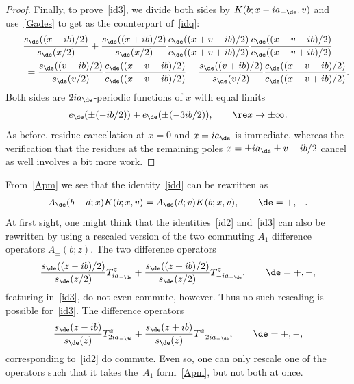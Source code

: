 \begin{proof}
Finally, to prove~\eqref{id3}, we divide both sides by
$K(b;x-ia_{-\de},v)$ and use~\eqref{Gades} to get as the counterpart of~\eqref{idq}:
\begin{gather}
   \frac{s_{\de}((x-ib)/2)}{s_{\de}(x/2)}+\frac{s_{\de}((x+ib)/2)}{s_{\de}(x/2)}\frac{c_{\de}((x+ v-ib)/2)}{c_{\de}((x+ v+ib)/2)}\frac{c_{\de}((x- v-ib)/2)}{c_{\de}((x- v+ib)/2)}  \nonumber \\
\qquad{} = \frac{s_{\de}((v-ib)/2)}{s_{\de}(v/2)} \frac{c_{\de}((x-v-ib)/2)}{c_{\de}((x-v+ib)/2)} +   \frac{s_{\de}((v+ib)/2)}{s_{\de}(v/2)} \frac{c_{\de}((x+v-ib)/2)}{c_{\de}((x+v+ib)/2)}.
\end{gather}
Both sides are $2ia_{\de}$-periodic functions of $x$ with equal limits
\begin{gather}
e_{\de}(\pm (-ib/2))+e_{\de}(\pm (-3ib/2)),\qquad \re x \to\pm\infty.
\end{gather}
As before, residue cancellation at $x=0$ and $x=ia_{\de}$ is immediate, whereas the verif\/ication that the residues at the remaining poles $x=\pm ia_{\de} \pm v  -ib/2$ cancel as well involves a bit more work.
\end{proof}


From~\eqref{Apm} we see that the identity~\eqref{idd} can be rewritten as
\begin{gather}
A_{\de}(b-d;x)K(b;x,v)=A_{\de}(d;v)K(b;x,v),\qquad \de=+,-.
\end{gather}
At f\/irst sight, one might think that the identities~\eqref{id2} and~\eqref{id3} can also be rewritten by using a rescaled version of the two commuting $A_1$ dif\/ference operators $A_{\pm}(b;z)$. The two dif\/ference operators
\begin{gather}
\frac{s_{\de}((z-ib)/2)}{s_{\de}(z/2)}T^z_{ia_{-\de}} +
\frac{s_{\de}((z+ib)/2)}{s_{\de}(z/2)}T^z_{-ia_{-\de}},\qquad \de=+,-,
\end{gather}
featuring in~\eqref{id3}, do not even commute, however. Thus no such rescaling is possible for~\eqref{id3}. The dif\/ference operators
\begin{gather}
\frac{s_{\de}(z-ib)}{s_{\de}(z)}T^z_{2ia_{-\de}} +
\frac{s_{\de}(z+ib)}{s_{\de}(z)}T^z_{-2ia_{-\de}},\qquad \de=+,-,
\end{gather}
corresponding to~\eqref{id2} do commute. Even so, one can only rescale one of the operators such that it takes the~$A_1$ form~\eqref{Apm}, but not both at once.

